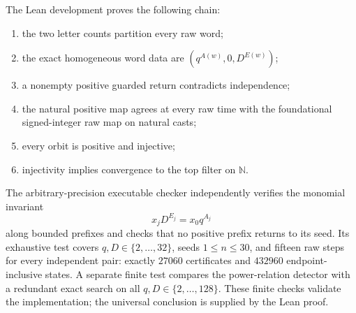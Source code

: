 \documentclass[11pt,letterpaper]{article}
\newcommand{\N}{\mathbb{N}}
\begin{document}
The Lean development proves the following chain:
\begin{enumerate}[label=(\roman*)]
 \item the two letter counts partition every raw word;
 \item the exact homogeneous word data are
       $(q^{A(w)},0,D^{E(w)})$;
 \item a nonempty positive guarded return contradicts independence;
 \item the natural positive map agrees at every raw time with the
       foundational signed-integer raw map on natural casts;
 \item every orbit is positive and injective;
 \item injectivity implies convergence to the top filter on $\N$.
\end{enumerate}

The arbitrary-precision executable checker independently verifies the
monomial invariant
\[
 x_jD^{E_j}=x_0q^{A_j}
\]
along bounded prefixes and checks that no positive prefix returns to its
seed.  Its exhaustive test covers $q,D\in\{2,\ldots,32\}$, seeds
$1\leq n\leq30$, and fifteen raw steps for every independent pair: exactly
$27060$ certificates and $432960$ endpoint-inclusive states.  A separate
finite test compares the power-relation detector with a redundant exact
search on all $q,D\in\{2,\ldots,128\}$.  These finite checks validate the
implementation; the universal conclusion is supplied by the Lean proof.



\end{document}
